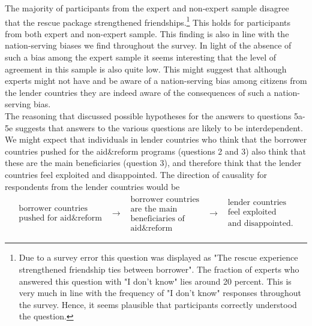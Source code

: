 The majority of participants from the expert and non-expert sample disagree that 
the rescue package strengthened friendships.\footnote{Due to a survey error this question was displayed as "The rescue experience strengthened friendship ties between borrower". The fraction of experts who answered this question with "I don't know" lies around 20 percent. This is very much in line with the frequency of "I don't know" responses throughout the survey. Hence, it seems plausible that participants correctly understood the question. } This holds for participants from 
both expert and non-expert sample. This finding is also in line with the nation-serving biases
we find throughout the survey. In light of the absence of such a bias among the expert sample 
it seems interesting that the level of agreement in this sample is also quite low. 
This might suggest that although experts might not have and be aware of a nation-serving bias
among citizens from the lender countries they are indeed aware of the consequences of such 
a nation-serving bias. 
\\

The reasoning that discussed possible hypotheses for the answers to
questions 5a-5e suggests that answers to the various questions are likely to
be interdependent. We might expect that individuals in lender countries who
think that the borrower countries pushed for the aid\&reform programs
(questions 2 and 3) also think that these are the main beneficiaries
(question 3), and therefore think that the lender countries feel exploited
and disappointed. The direction of causality for respondents from the lender
countries would be%
\begin{equation*}
\begin{array}{ccccc}
\begin{array}{c}
\text{borrower countries} \\ 
\text{pushed for aid\&reform}%
\end{array}
& \rightarrow  & 
\begin{array}{c}
\text{borrower countries} \\ 
\text{are the main} \\ 
\text{beneficiaries of} \\ 
\text{aid\&reform}%
\end{array}
& \rightarrow  & 
\begin{array}{c}
\text{lender countries} \\ 
\text{feel exploited} \\ 
\text{and disappointed.}%
\end{array}%
\end{array}%
\end{equation*}

